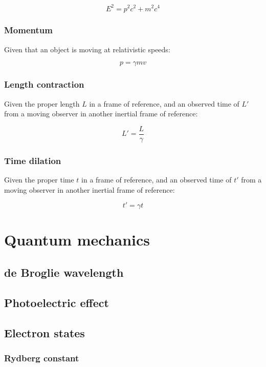 \documentclass[12pt]{article}
\begin{document}
\[
\boxed{
E^2 = p^2 c^2 + m^2 c^4
}
\]

\subsubsection{Momentum}

Given that an object is moving at relativistic speeds:

\[
\boxed{
p = \gamma m v
}
\]

\subsubsection{Length contraction}

Given the proper length $L$ in a frame of reference, and an observed time of $L'$ from a moving observer in another inertial frame of reference:

\[
\boxed{
L' = \frac{L}{\gamma}
}
\]

\subsubsection{Time dilation}

Given the proper time $t$ in a frame of reference, and an observed time of $t'$ from a moving observer in another inertial frame of reference:

\[
\boxed{
t' = \gamma t
}
\]

\section{Quantum mechanics}

\subsection{de Broglie wavelength}

\subsection{Photoelectric effect}

\subsection{Electron states}

\subsubsection{Rydberg constant}
\end{document}
